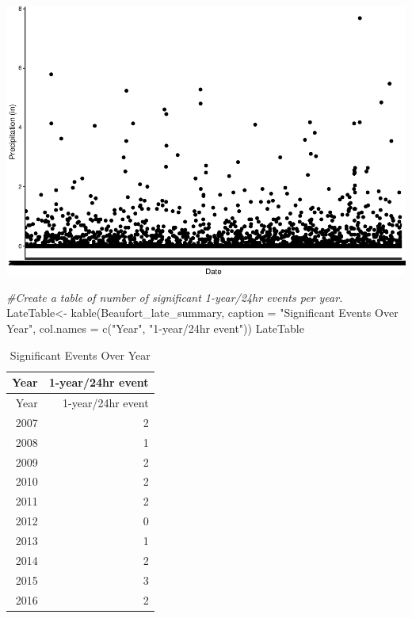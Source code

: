 \documentclass[
  12pt,
]{article}
\newenvironment{Shaded}{\begin{snugshade}}{\end{snugshade}}
\newcommand{\AttributeTok}[1]{\textcolor[rgb]{0.77,0.63,0.00}{#1}}
\newcommand{\CommentTok}[1]{\textcolor[rgb]{0.56,0.35,0.01}{\textit{#1}}}
\newcommand{\FunctionTok}[1]{\textcolor[rgb]{0.00,0.00,0.00}{#1}}
\newcommand{\NormalTok}[1]{#1}
\newcommand{\OtherTok}[1]{\textcolor[rgb]{0.56,0.35,0.01}{#1}}
\newcommand{\StringTok}[1]{\textcolor[rgb]{0.31,0.60,0.02}{#1}}
\begin{document}
\includegraphics{Final_Project_Thornton_Katayama_Ngenzi_files/figure-latex/late-2.pdf}

\begin{Shaded}
\begin{Highlighting}[]
\CommentTok{\#Create a table of number of significant 1{-}year/24hr events per year.}
\NormalTok{LateTable}\OtherTok{\textless{}{-}} \FunctionTok{kable}\NormalTok{(Beaufort\_late\_summary, }\AttributeTok{caption =} \StringTok{"Significant Events Over Year"}\NormalTok{, }\AttributeTok{col.names =} \FunctionTok{c}\NormalTok{(}\StringTok{"Year"}\NormalTok{, }\StringTok{"1{-}year/24hr event"}\NormalTok{))}
\NormalTok{LateTable}
\end{Highlighting}
\end{Shaded}

\begin{longtable}[]{@{}rr@{}}
\caption{Significant Events Over Year}\tabularnewline
\toprule
Year & 1-year/24hr event \\
\midrule
\endfirsthead
\toprule
Year & 1-year/24hr event \\
\midrule
\endhead
2007 & 2 \\
2008 & 1 \\
2009 & 2 \\
2010 & 2 \\
2011 & 2 \\
2012 & 0 \\
2013 & 1 \\
2014 & 2 \\
2015 & 3 \\
2016 & 2 \\
\bottomrule
\end{longtable}
\end{document}
